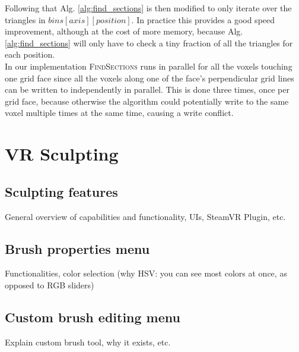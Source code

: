 Following that Alg. \ref{alg:find_sections} is then modified to only iterate over the triangles in $bins[axis][position]$.
In practice this provides a good speed improvement, although at the cost of more memory, because Alg. \ref{alg:find_sections} will
only have to check a tiny fraction of all the triangles for each position.\\
In our implementation \textsc{FindSections} runs in parallel for all the voxels touching one grid face since all the voxels along one
of the face's perpendicular grid lines can be written to independently in parallel. This is done three times, once per grid face, because otherwise the algorithm could potentially write to the same voxel multiple times at the same time, causing a write conflict.

\section{VR Sculpting}

\subsection{Sculpting features}
General overview of capabilities and functionality, UIs, SteamVR Plugin, etc.

\subsection{Brush properties menu}
Functionalities, color selection (why HSV: you can see most colors at once, as opposed to RGB sliders)

\subsection{Custom brush editing menu}
Explain custom brush tool, why it exists, etc.